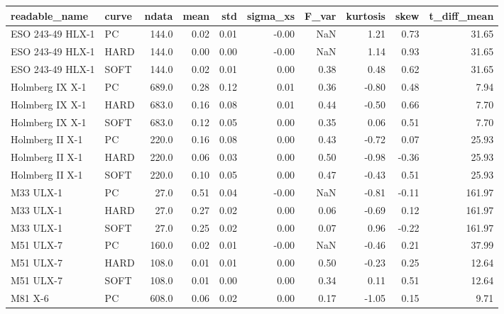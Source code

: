 \begin{tabular}{llrrrrrrrr}
\toprule
     readable\_name & curve &  ndata &  mean &  std &  sigma\_xs &  F\_var &  kurtosis &  skew &  t\_diff\_mean \\
\midrule
  ESO 243-49 HLX-1 &    PC &  144.0 &  0.02 & 0.01 &     -0.00 &    NaN &      1.21 &  0.73 &        31.65 \\
  ESO 243-49 HLX-1 &  HARD &  144.0 &  0.00 & 0.00 &     -0.00 &    NaN &      1.14 &  0.93 &        31.65 \\
  ESO 243-49 HLX-1 &  SOFT &  144.0 &  0.02 & 0.01 &      0.00 &   0.38 &      0.48 &  0.62 &        31.65 \\
   Holmberg IX X-1 &    PC &  689.0 &  0.28 & 0.12 &      0.01 &   0.36 &     -0.80 &  0.48 &         7.94 \\
   Holmberg IX X-1 &  HARD &  683.0 &  0.16 & 0.08 &      0.01 &   0.44 &     -0.50 &  0.66 &         7.70 \\
   Holmberg IX X-1 &  SOFT &  683.0 &  0.12 & 0.05 &      0.00 &   0.35 &      0.06 &  0.51 &         7.70 \\
   Holmberg II X-1 &    PC &  220.0 &  0.16 & 0.08 &      0.00 &   0.43 &     -0.72 &  0.07 &        25.93 \\
   Holmberg II X-1 &  HARD &  220.0 &  0.06 & 0.03 &      0.00 &   0.50 &     -0.98 & -0.36 &        25.93 \\
   Holmberg II X-1 &  SOFT &  220.0 &  0.10 & 0.05 &      0.00 &   0.47 &     -0.43 &  0.51 &        25.93 \\
         M33 ULX-1 &    PC &   27.0 &  0.51 & 0.04 &     -0.00 &    NaN &     -0.81 & -0.11 &       161.97 \\
         M33 ULX-1 &  HARD &   27.0 &  0.27 & 0.02 &      0.00 &   0.06 &     -0.69 &  0.12 &       161.97 \\
         M33 ULX-1 &  SOFT &   27.0 &  0.25 & 0.02 &      0.00 &   0.07 &      0.96 & -0.22 &       161.97 \\
         M51 ULX-7 &    PC &  160.0 &  0.02 & 0.01 &     -0.00 &    NaN &     -0.46 &  0.21 &        37.99 \\
         M51 ULX-7 &  HARD &  108.0 &  0.01 & 0.01 &      0.00 &   0.50 &     -0.23 &  0.25 &        12.64 \\
         M51 ULX-7 &  SOFT &  108.0 &  0.01 & 0.00 &      0.00 &   0.34 &      0.11 &  0.51 &        12.64 \\
           M81 X-6 &    PC &  608.0 &  0.06 & 0.02 &      0.00 &   0.17 &     -1.05 &  0.15 &         9.71 \\

\end{tabular}
